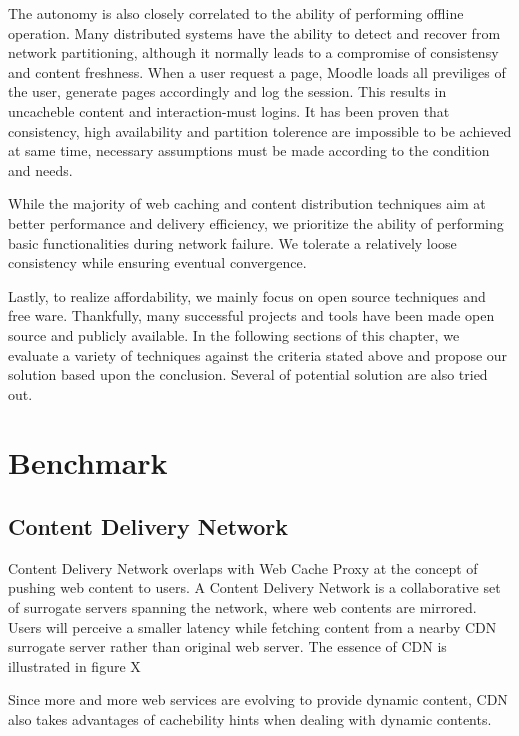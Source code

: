 The autonomy is also closely correlated to the ability of performing offline
operation. Many distributed systems have the ability to detect and recover from
network partitioning, although it normally leads to a compromise of consistensy
and content freshness. When a user request a page, Moodle loads all previliges of the user, generate pages accordingly and log the session. This results in uncacheble content and interaction-must logins.
It has been proven that consistency, high availability and partition tolerence
are impossible to be achieved at same time\cite{brewer2000towards}\cite{gilbert2002brewer}, necessary assumptions must
be made according to the condition and needs.

While the majority of web caching and content distribution techniques aim at
better performance and delivery efficiency, we prioritize the ability of
performing basic functionalities during network failure. We tolerate a
relatively loose consistency while ensuring eventual convergence.

Lastly, to realize affordability, we mainly focus on open source techniques and
free ware. Thankfully, many successful projects and tools have been made open
source and publicly available. In the following sections of this chapter, we
evaluate a variety of techniques against the criteria stated above and propose
our solution based upon the conclusion. Several of potential solution are also
tried out.


\section{Benchmark}

\subsection{Content Delivery Network}
Content Delivery Network overlaps with Web Cache Proxy at the concept of pushing web content to users. A Content Delivery Network is a collaborative set of surrogate servers spanning the network, where web contents are mirrored\cite{pathan2008content}. Users will perceive a smaller latency while fetching content from a nearby CDN surrogate server rather than original web server. The essence of CDN is illustrated in figure X

Since more and more web services are evolving to provide dynamic content, CDN also takes advantages of cachebility hints when dealing with dynamic contents\cite{dilley2002globally}. 

